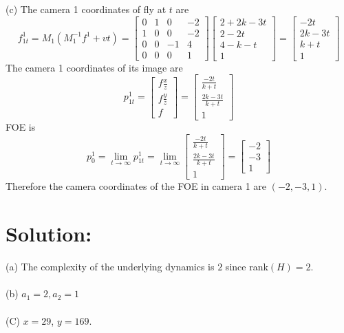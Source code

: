 \documentclass[12pt]{article}
\begin{document}
\noindent (c) The camera 1 coordinates of fly at $t$ are  
\begin{equation*}
f_{1t}^1 = M_1 \left ( M_1^{-1}f^1 + vt \right ) = \left[ \begin{array}{cccc}
0 & 1 & 0 & -2\\
1 & 0 & 0 & -2\\
0 & 0 & -1 & 4\\
0 & 0 & 0 & 1
\end{array} \right] \left[ \begin{array}{c}
2 + 2k - 3t\\
2 - 2t\\
4 - k - t\\
1
\end{array} \right] = \left[ \begin{array}{c}
-2t\\
2k-3t\\
k+t\\
1
\end{array} \right]
\end{equation*}
The camera 1 coordinates of its image are 
\begin{equation*}
p_{1t}^1 = \left[ \begin{array}{c}
f\frac{x}{z}\\
f\frac{y}{z}\\
f
\end{array} \right]  = \left[ \begin{array}{c}
\frac{-2t}{k+t}\\
\frac{2k-3t}{k+t}\\
1
\end{array} \right]
\end{equation*}
FOE is 
\begin{equation*}
p^1_0 = \lim\limits_{t\to\infty}p_{1t}^1 = \lim\limits_{t\to\infty} \left[ \begin{array}{c}
\frac{-2t}{k+t}\\
\frac{2k-3t}{k+t}\\
1
\end{array} \right] = \left[ \begin{array}{c}
-2\\
-3\\
1
\end{array} \right]
\end{equation*}
Therefore the camera coordinates of the FOE in camera 1 are $(-2, -3, 1)$.


\section{Solution:}
(a) The complexity of the underlying dynamics is $2$ since rank$(H) = 2$.\\
\\
(b) $a_1 = 2, a_2 = 1$\\
\\
(C) $x = 29$, $y = 169$.
\end{document}
